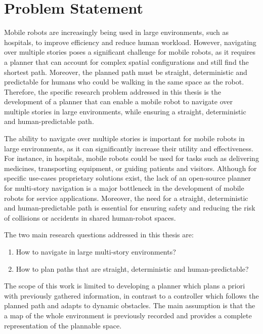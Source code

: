 \section{Problem Statement}
\label{sec:problem_statement}
Mobile robots are increasingly being used in large environments, such as hospitals, to improve efficiency and reduce human workload. However, navigating over multiple stories poses a significant challenge for mobile robots, as it requires a planner that can account for complex spatial configurations and still find the shortest path. Moreover, the planned path must be straight, deterministic and predictable for humans who could be walking in the same space as the robot. Therefore, the specific research problem addressed in this thesis is the development of a planner that can enable a mobile robot to navigate over multiple stories in large environments, while ensuring a straight, deterministic and human-predictable path. 

The ability to navigate over multiple stories is important for mobile robots in large environments, as it can significantly increase their utility and effectiveness. For instance, in hospitals, mobile robots could be used for tasks such as delivering medicines, transporting equipment, or guiding patients and visitors. Although for specific use-cases proprietary solutions exist, the lack of an open-source planner for multi-story navigation is a major bottleneck in the development of mobile robots for service applications. Moreover, the need for a straight, deterministic and human-predictable path is essential for ensuring safety and reducing the risk of collisions or accidents in shared human-robot spaces.

The two main research questions addressed in this thesis are:
\begin{enumerate}
    \item How to navigate in large multi-story environments?
    \item How to plan paths that are straight, deterministic and human-predictable?
\end{enumerate}

The scope of this work is limited to developing a planner which plans a priori with previously gathered information, in contrast to a controller which follows the planned path and adapts to dynamic obstacles. The main assumption is that the a map of the whole environment is previously recorded and provides a complete representation of the plannable space.

